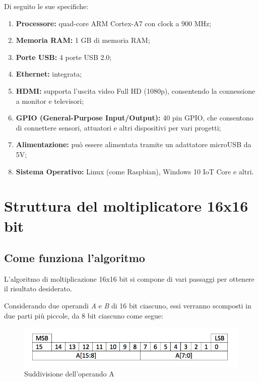 \documentclass[titlepage]{report}
\begin{document}
		Di seguito le sue specifiche:
		
		\begin{enumerate}
			\item \textbf{Processore:} quad-core ARM Cortex-A7 con clock a 900 MHz;
			
			\item \textbf{Memoria RAM:}  1 GB di memoria RAM;
			\item \textbf{Porte USB:}  4 porte USB 2.0;
			
			\item \textbf{Ethernet:} integrata;
			\item \textbf{HDMI:} supporta l'uscita video Full HD (1080p), consentendo la connessione a monitor e televisori;
			
			\item \textbf{GPIO (General-Purpose Input/Output):} 40 pin GPIO, che consentono di connettere sensori, attuatori e altri dispositivi per vari progetti;
			
			\item \textbf{Alimentazione:} può essere alimentata tramite un adattatore microUSB da 5V;
			
			\item \textbf{Sistema Operativo:}  Linux (come Raspbian), Windows 10 IoT Core e altri.

		\end{enumerate}


\chapter*{Struttura del moltiplicatore 16x16 bit}
\label{ch:struttura_moltiplicatore}

	\section*{Come funziona l'algoritmo}
	\label{sec:how_it_works}
		L'algoritmo di moltiplicazione 16x16 bit si compone di vari passaggi per ottenere il risultato desiderato.
		
		Considerando due operandi \textit{A} e \textit{B} di 16 bit ciascuno, essi verranno scomposti in due parti più piccole, da 8 bit ciascuno come segue: 

		\begin{figure}[ht]
			\centering
			\includegraphics[scale=0.4]{./img/operand-16-bit.jpeg}
			\caption{Suddivisione dell'operando A}
			\label{fig:operando_a}
		\end{figure}
\end{document}
